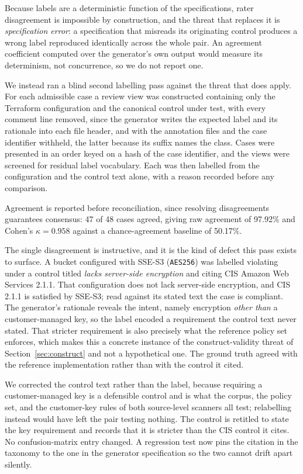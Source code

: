 \documentclass[journal]{IEEEtran}
\begin{document}
Because labels are a deterministic function of the specifications, rater
disagreement is impossible by construction, and the threat that replaces it is
\emph{specification error}: a specification that misreads its originating control
produces a wrong label reproduced identically across the whole pair. An agreement
coefficient computed over the generator's own output would measure its determinism,
not concurrence, so we do not report one.

We instead ran a blind second labelling pass against the threat that does apply.
For each admissible case a review view was constructed containing only the
Terraform configuration and the canonical control under test, with every comment
line removed, since the generator writes the expected label and its rationale into
each file header, and with the annotation files and the case identifier withheld,
the latter because its suffix names the class. Cases were presented in an order keyed on a hash of the case
identifier, and the views were screened for residual label vocabulary. Each was
then labelled from the configuration and the control text alone, with a reason
recorded before any comparison.

Agreement is reported before reconciliation, since resolving disagreements
guarantees consensus: 47 of 48 cases agreed, giving raw agreement of 97.92\% and
Cohen's $\kappa = 0.958$ against a chance-agreement baseline of 50.17\%.

The single disagreement is instructive, and it is the kind of defect this pass
exists to surface. A bucket configured with SSE-S3 (\texttt{AES256}) was labelled
violating under a control titled \emph{lacks server-side encryption} and citing CIS
Amazon Web Services 2.1.1. That configuration does not lack server-side encryption,
and CIS 2.1.1 is satisfied by SSE-S3; read against its stated text the case is
compliant. The generator's rationale reveals the intent, namely encryption
\emph{other than} a customer-managed key, so the label encoded a requirement the
control text never stated. That stricter requirement is also precisely what the reference policy
set enforces, which makes this a concrete instance of the construct-validity threat
of Section~\ref{sec:construct} and not a hypothetical one. The ground truth
agreed with the reference implementation rather than with the control it cited.

We corrected the control text rather than the label, because requiring a
customer-managed key is a defensible control and is what the corpus, the policy set,
and the customer-key rules of both source-level scanners all test; relabelling
instead would have left the pair testing nothing. The control is retitled to state
the key requirement and records that it is stricter than the CIS control it cites.
No confusion-matrix entry changed. A regression test now pins the citation in the
taxonomy to the one in the generator specification so the two cannot drift apart
silently.
\end{document}
